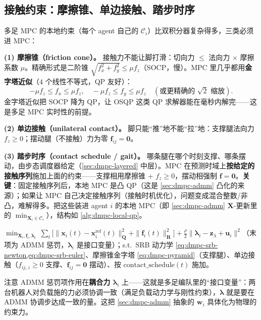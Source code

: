 \subsection{接触约束：摩擦锥、单边接触、踏步时序}
\label{sec:dmpc-contact}

多足 MPC 的本地约束（每个 agent 自己的 $\mathcal{C}_i$）比双积分器复杂得多，三类必须进 MPC：

\textbf{(1) 摩擦锥（friction cone）。} 接触力不能让脚打滑：切向力 $\le$ 法向力 $\times$ 摩擦系数 $\mu$。精确形式是二阶锥 $\sqrt{f_x^2+f_y^2}\le\mu f_z$（SOCP，慢）。MPC 里几乎都用\textbf{金字塔近似}（$4$ 个线性不等式，QP 友好）：
\begin{equation}
  -\mu f_z\le f_x\le\mu f_z,\quad -\mu f_z\le f_y\le\mu f_z \quad(\text{或更精确的 }\sqrt2\text{ 缩放}).
  \label{eq:dmpc-pyramid}
\end{equation}
金字塔近似把 SOCP 降为 QP，让 OSQP 这类 QP 求解器能在毫秒内解完——这是多足 MPC 实时性的前提。

\textbf{(2) 单边接触（unilateral contact）。} 脚只能“推”地不能“拉”地：支撑腿法向力 $f_z\ge0$；摆动腿（不接触）力为零 $\mathbf{f}_{ij}=\mathbf{0}$。

\textbf{(3) 踏步时序（contact schedule / gait）。} 哪条腿在哪个时刻支撑、哪条摆动，由步态调度器给定（\cref{sec:dmpc-layered} 中层）。MPC 在预测时域上\textbf{按给定的接触序列}施加上面的约束——支撑相用摩擦锥 $+$ $f_z\ge0$，摆动相强制 $\mathbf{f}=\mathbf{0}$。\textbf{关键}：固定接触序列后，本地 MPC 是凸 QP（这是 \cref{sec:dmpc-admm} 凸化的来源）；如果让 MPC 自己决定接触序列（接触时机优化），问题变成混合整数/非凸，难解得多。把这些装进 agent $i$ 的本地 MPC（即 \cref{sec:dmpc-admm} $\mathbf{X}$-更新里的 $\min_{\mathbf{X}_i\in\mathcal{C}_i}$），结构如 \cref{alg:dmpc-local-qp}。

\begin{algo}\label{alg:dmpc-local-qp}
$\min_{\mathbf{X}_i,\mathbf{f}_i,\boldsymbol{\lambda}_i}\ \sum_t\big[\|\mathbf{x}_i(t)-\mathbf{x}_i^{\text{ref}}(t)\|_{\mathbf{Q}}^2+\|\mathbf{f}_i(t)\|_{\mathbf{R}}^2\big]+\tfrac{\rho}{2}\|\boldsymbol{\lambda}_i-\mathbf{z}_\lambda+\mathbf{u}_i\|^2$（末项为 ADMM 惩罚，$\boldsymbol{\lambda}_i$ 是接口变量）；s.t.\ SRB 动力学 \cref{eq:dmpc-srb-newton,eq:dmpc-srb-euler}、摩擦锥金字塔 \cref{eq:dmpc-pyramid}（支撑腿）、单边接触（$f_{ij,z}\ge0$ 支撑、$\mathbf{f}_{ij}=\mathbf{0}$ 摆动）、按 $\text{contact\_schedule}(t)$ 施加。
\end{algo}

\noindent 注意 ADMM 惩罚项作用在\textbf{耦合力 $\boldsymbol{\lambda}_i$} 上——这就是多足编队里的“接口变量”：两台机器人对负载施的力必须协调一致（满足负载动力学与刚性约束），$\boldsymbol{\lambda}$ 就是要在 ADMM 协调步达成一致的量。这把 \cref{sec:dmpc-admm} 抽象的 $\mathbf{w}_i$ 具体化为物理的约束力。


